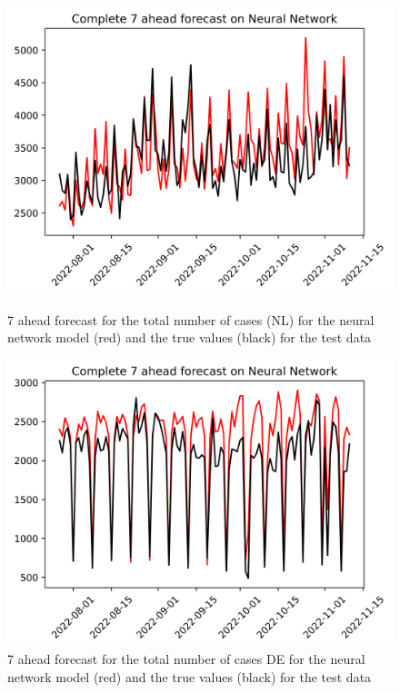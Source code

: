 \begin{figure}

\begin{minipage}{.45\textwidth}
  \centering
  \includegraphics[width=\linewidth]{pics/7_ah/Complete_7_ahead_Neural Network.png}
  \caption{7 ahead forecast for the total number of cases (NL) for the neural network model (red) and the true values (black) for the test data}
  \label{fig:tot_cases_fc_7_nn}
\end{minipage}
\begin{minipage}{.45\textwidth}
  \centering
  \includegraphics[width=\linewidth]{pics/7_ah/DE_Complete_7_ahead_Neural Network.png}
  \caption{7 ahead forecast for the total number of cases DE for the neural network model (red) and the true values (black) for the test data}
  \label{fig:tot_cases_fc_7_nn_DE}
\end{minipage}

\end{figure}
